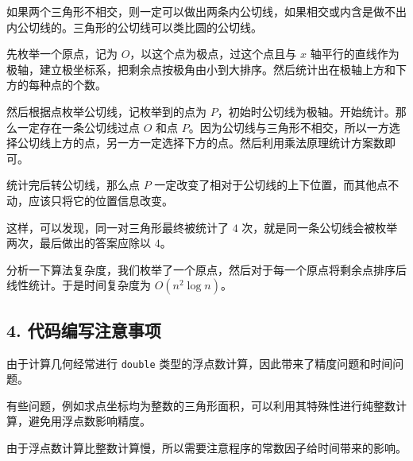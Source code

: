 如果两个三角形不相交，则一定可以做出两条内公切线，如果相交或内含是做不出内公切线的。三角形的公切线可以类比圆的公切线。

先枚举一个原点，记为 $O$，以这个点为极点，过这个点且与 $x$ 轴平行的直线作为极轴，建立极坐标系，把剩余点按极角由小到大排序。然后统计出在极轴上方和下方的每种点的个数。

然后根据点枚举公切线，记枚举到的点为 $P$，初始时公切线为极轴。开始统计。那么一定存在一条公切线过点 $O$ 和点 $P$。因为公切线与三角形不相交，所以一方选择公切线上方的点，另一方一定选择下方的点。然后利用乘法原理统计方案数即可。

统计完后转公切线，那么点 $P$ 一定改变了相对于公切线的上下位置，而其他点不动，应该只将它的位置信息改变。

这样，可以发现，同一对三角形最终被统计了 $4$ 次，就是同一条公切线会被枚举两次，最后做出的答案应除以 $4$。

分析一下算法复杂度，我们枚举了一个原点，然后对于每一个原点将剩余点排序后线性统计。于是时间复杂度为 $O(n^2\log n)$。

\subsection{4. 代码编写注意事项}

由于计算几何经常进行 \texttt{double} 类型的浮点数计算，因此带来了精度问题和时间问题。

有些问题，例如求点坐标均为整数的三角形面积，可以利用其特殊性进行纯整数计算，避免用浮点数影响精度。

由于浮点数计算比整数计算慢，所以需要注意程序的常数因子给时间带来的影响。
